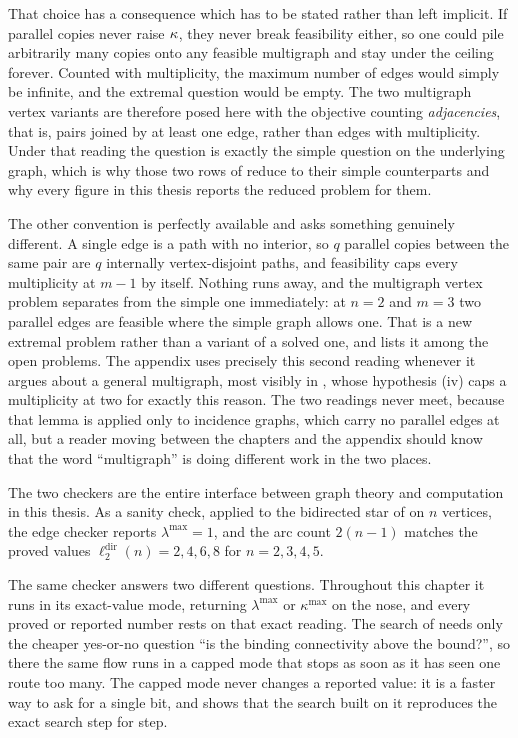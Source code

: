 \begin{remark}\label{sec:parallel-convention}
That choice has a consequence which has to be stated rather than left implicit. If parallel copies never raise $\kappa$, they never break feasibility either, so one could pile arbitrarily many copies onto any feasible multigraph and stay under the ceiling forever. Counted with multiplicity, the maximum number of edges would simply be infinite, and the extremal question would be empty. The two multigraph vertex variants are therefore posed here with the objective counting \emph{adjacencies}, that is, pairs joined by at least one edge, rather than edges with multiplicity. Under that reading the question is exactly the simple question on the underlying graph, which is why those two rows of  reduce to their simple counterparts and why every figure in this thesis reports the reduced problem for them.

The other convention is perfectly available and asks something genuinely different. A single edge is a path with no interior, so $q$ parallel copies between the same pair are $q$ internally vertex-disjoint paths, and feasibility caps every multiplicity at $m-1$ by itself. Nothing runs away, and the multigraph vertex problem separates from the simple one immediately: at $n = 2$ and $m = 3$ two parallel edges are feasible where the simple graph allows one. That is a new extremal problem rather than a variant of a solved one, and  lists it among the open problems. The appendix uses precisely this second reading whenever it argues about a general multigraph, most visibly in , whose hypothesis (iv) caps a multiplicity at two for exactly this reason. The two readings never meet, because that lemma is applied only to incidence graphs, which carry no parallel edges at all, but a reader moving between the chapters and the appendix should know that the word ``multigraph'' is doing different work in the two places.
\end{remark}

The two checkers are the entire interface between graph theory and computation in this thesis. As a sanity check, applied to the bidirected star of  on $n$ vertices, the edge checker reports $\lambda^{\max} = 1$, and the arc count $2(n-1)$ matches the proved values $\ell_2^{\mathrm{dir}}(n) = 2, 4, 6, 8$ for $n = 2, 3, 4, 5$.

The same checker answers two different questions. Throughout this chapter it runs in its exact-value mode, returning $\lambda^{\max}$ or $\kappa^{\max}$ on the nose, and every proved or reported number rests on that exact reading. The search of  needs only the cheaper yes-or-no question ``is the binding connectivity above the bound?'', so there the same flow runs in a capped mode that stops as soon as it has seen one route too many. The capped mode never changes a reported value: it is a faster way to ask for a single bit, and  shows that the search built on it reproduces the exact search step for step.

